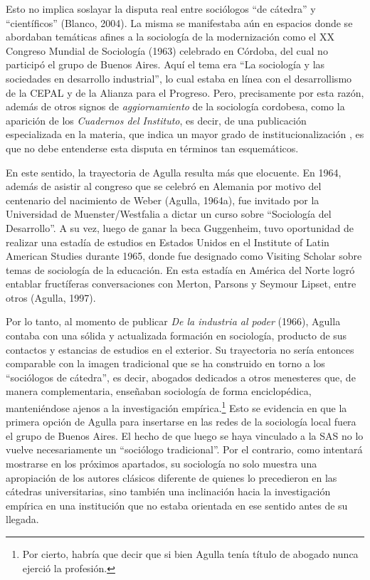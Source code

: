 Esto no implica soslayar la disputa real entre sociólogos \enquote{de cátedra} y \enquote{científicos} (Blanco, 2004). La misma se manifestaba aún en espacios donde se abordaban temáticas afines a la sociología de la modernización como el XX Congreso Mundial de Sociología (1963) celebrado en Córdoba, del cual no participó el grupo de Buenos Aires. Aquí el tema era \enquote{La sociología y las sociedades en desarrollo industrial}, lo cual estaba en línea con el desarrollismo de la CEPAL y de la Alianza para el Progreso. Pero, precisamente por esta razón, además de otros signos de \emph{aggiornamiento} de la sociología cordobesa, como la aparición de los \emph{Cuadernos del Instituto}, es decir, de una publicación especializada en la materia, que indica un mayor grado de institucionalización \parencite{1512-SHILS1971}, es que no debe entenderse esta disputa en términos tan esquemáticos.

En este sentido, la trayectoria de Agulla resulta más que elocuente. En 1964, además de asistir al congreso que se celebró en Alemania por motivo del centenario del nacimiento de Weber (Agulla, 1964a), fue invitado por la Universidad de Muenster/Westfalia a dictar un curso sobre \enquote{Sociología del Desarrollo}. A su vez, luego de ganar la beca Guggenheim, tuvo oportunidad de realizar una estadía de estudios en Estados Unidos en el Institute of Latin American Studies durante 1965, donde fue designado como Visiting Scholar sobre temas de sociología de la educación. En esta estadía en América del Norte logró entablar fructíferas conversaciones con Merton, Parsons y Seymour Lipset, entre otros (Agulla, 1997).

Por lo tanto, al momento de publicar \emph{De la industria al poder} (1966), Agulla contaba con una sólida y actualizada formación en sociología, producto de sus contactos y estancias de estudios en el exterior. Su trayectoria no sería entonces comparable con la imagen tradicional que se ha construido en torno a los \enquote{sociólogos de cátedra}, es decir, abogados dedicados a otros menesteres que, de manera complementaria, enseñaban sociología de forma enciclopédica, manteniéndose ajenos a la investigación empírica.\footnote{Por cierto, habría que decir que si bien Agulla tenía título de abogado nunca ejerció la profesión.} Esto se evidencia en que la primera opción de Agulla para insertarse en las redes de la sociología local fuera el grupo de Buenos Aires. El hecho de que luego se haya vinculado a la SAS no lo vuelve necesariamente un \enquote{sociólogo tradicional}. Por el contrario, como intentará mostrarse en los próximos apartados, su sociología no solo muestra una apropiación de los autores clásicos diferente de quienes lo precedieron en las cátedras universitarias, sino también una inclinación hacia la investigación empírica en una institución que no estaba orientada en ese sentido antes de su llegada.

